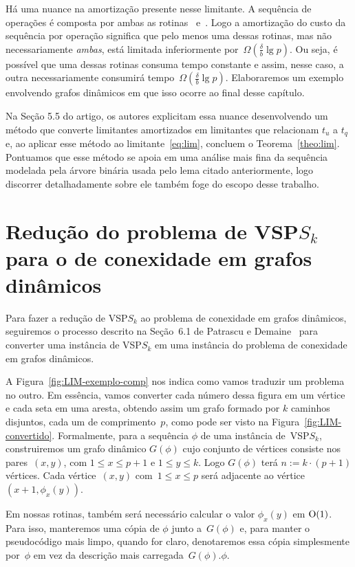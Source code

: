 Há uma nuance na amortização presente nesse limitante. A sequência de operações é composta por ambas as rotinas~\VPSPupdate{} e~\VPSPverify.
Logo a amortização do custo da sequência por operação significa que pelo menos uma dessas rotinas, mas não necessariamente \textit{ambas}, está limitada inferiormente por~$\Omega(\frac{\delta}{b}\lg p)$. Ou seja, é possível que uma dessas rotinas consuma tempo constante e assim, nesse caso, a outra necessariamente consumirá tempo~$\Omega(\frac{\delta}{b}\lg p)$. Elaboraremos um exemplo envolvendo grafos dinâmicos em que isso ocorre ao final desse capítulo. 


Na Seção 5.5 do artigo, os autores explicitam essa nuance desenvolvendo um método que converte limitantes amortizados em limitantes que relacionam $t_u$ a $t_q$ e, ao aplicar esse método ao limitante~\eqref{eq:lim}, concluem o Teorema~\ref{theo:lim}. Pontuamos que esse método se apoia em uma análise mais fina da sequência modelada pela árvore binária usada pelo lema citado anteriormente, logo discorrer detalhadamente sobre ele também foge do escopo desse trabalho.


\section[Redução do VSP$S_k$ para conexidade em grafos dinâmicos]{Redução do problema de VSP$S_k$ para o de conexidade em grafos dinâmicos}

Para fazer a redução de VSP$S_k$ ao problema de conexidade em grafos dinâmicos, seguiremos o processo descrito na Seção~6.1 de Patrascu e Demaine~\cite{lowerBoundPatrascu} para  converter uma instância de VSP$S_k$ em uma instância do problema de conexidade em grafos dinâmicos. 

A Figura~\ref{fig:LIM-exemplo-comp} nos indica como vamos traduzir um problema no outro. Em essência, vamos converter cada número dessa figura em um vértice e cada seta em uma aresta, obtendo assim um grafo formado por $k$ caminhos disjuntos, cada um de comprimento~$p$, como pode ser visto na Figura~\ref{fig:LIM-convertido}. Formalmente, para a sequência $\phi$ de uma instância de~VSP$S_k$, construiremos um grafo dinâmico $G(\phi)$ cujo conjunto de vértices consiste nos pares~$(x,y)$, com $1\leqslant x \leqslant p+1$ e $1\leqslant y \leqslant k$. Logo $G(\phi)$ terá $n:=k\cdot (p+1)$ vértices. Cada vértice~$(x,y)$ com~$1\leqslant x \leqslant p$ será adjacente ao vértice~$(x+1,\phi_x(y))$. 

Em nossas rotinas, também será necessário calcular o valor $\phi_x(y)$ em $\mathrm{O}(1)$. Para isso, manteremos uma cópia de $\phi$ junto a~$G(\phi)$ e, para manter o pseudocódigo mais limpo, quando for claro, denotaremos essa cópia simplesmente por~$\phi$ em vez da descrição mais carregada~$G(\phi).\phi$.


